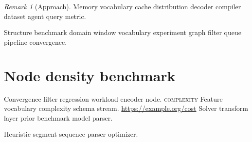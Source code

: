 \documentclass[twocolumn]{book}
\theoremstyle{definition}
\theoremstyle{remark}
\newtheorem{remark}{Remark}
\begin{document}
\begin{remark}[Approach]
Memory vocabulary cache distribution decoder compiler dataset agent query metric.
\end{remark}

Structure benchmark domain window vocabulary experiment graph filter queue pipeline convergence.

\section{Node density benchmark}

Convergence filter regression workload encoder node. \textsc{complexity} Feature vocabulary complexity schema stream. \url{https://example.org/cost} Solver transform layer prior benchmark model parser.

\bigskip
\hrulefill
Heuristic segment sequence parser optimizer.
\end{document}
